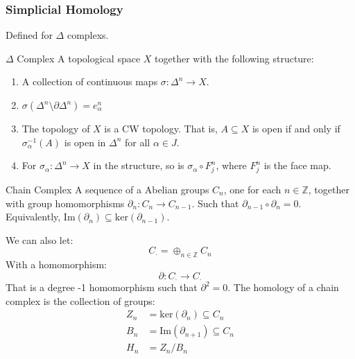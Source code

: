         \subsubsection{Simplicial Homology}
            Defined for $\Delta$ complexs.
            \begin{ldefinition}{$\Delta$ Complex}
                A topological space $X$ together with the
                following structure:
                \begin{enumerate}
                    \item A collection of continuous
                          maps $\sigma:\Delta^{n}\rightarrow{X}$.
                    \item $\sigma(\Delta^{n}\setminus%
                           \partial\Delta^{n})=e_{\alpha}^{n}$
                    \item The topology of $X$ is a CW topology.
                          That is, $A\subseteq{X}$ is open
                          if and only if
                          $\sigma_{\alpha}^{\minus{1}}(A)$ is
                          open in $\Delta^{n}$ for all
                          $\alpha\in{J}$.
                    \item For $\sigma_{\alpha}:%
                          \Delta^{n}\rightarrow{X}$ in the
                          structure, so is
                          $\sigma_{\alpha}\circ{F}_{j}^{n}$,
                          where $F_{j}^{n}$ is the face map.
                \end{enumerate}
            \end{ldefinition}
            \begin{ldefinition}{Chain Complex}
                A sequence of a Abelian groups
                $C_{n}$, one for each $n\in\mathbb{Z}$,
                together with group homomorphisms
                $\partial_{n}:C_{n}\rightarrow{C}_{n-1}$.
                Such that $\partial_{n-1}\circ\partial_{n}=0$. 
                Equivalently,
                $\mathrm{Im}(\partial_{n})\subseteq%
                 \mathrm{ker}(\partial_{n-1})$.
            \end{ldefinition}
            We can also let:
            \begin{equation}
                C_{\cdot}=\oplus_{n\in\mathbb{Z}}C_{n}
            \end{equation}
            With a homomorphism:
            \begin{equation}
                \partial:C_{\cdot}\rightarrow{C}_{\cdot}
            \end{equation}
            That is a degree -1 homomorphism such that
            $\partial^{2}=0$. The homology of a chain
            complex is the collection of groups:
            \begin{align}
                Z_{n}&=\mathrm{ker}(\partial_{n})
                    \subseteq{C}_{n}\\
                B_{n}&=\mathrm{Im}(\partial_{n+1})
                    \subseteq{C}_{n}\\
                H_{n}&=Z_{n}/B_{n}
            \end{align}
